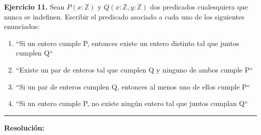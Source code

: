 \hypertarget{ej11}{}
\noindent \textbf{Ejercicio 11.} Sean $P(x:\mathbb{Z})$ y $Q(x:\mathbb{Z}, y:\mathbb{Z})$ dos predicados cualesquiera que nunca se indefinen. Escribir el predicado asociado a cada uno de los siguientes enunciados:

\begin{enumerate}[label=\alph*)]
    \item “Si un entero cumple P, entonces existe un entero distinto tal que juntos cumplen Q“
    \item “Existe un par de enteros tal que cumplen Q y ninguno de ambos cumple P“
    \item “Si un par de enteros cumplen Q, entonces al menos uno de ellos cumple P“
    \item “Si un entero cumple P, no existe ningún entero tal que juntos cumplan Q“
\end{enumerate}

\vspace{0.2cm}
{\color{gray}\hrule}
\vspace{0.4cm}

\textbf{Resolución:}

